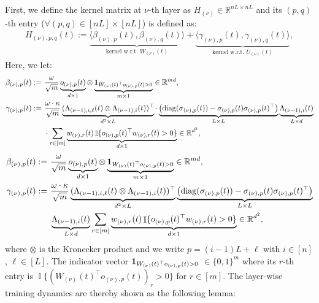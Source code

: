 \documentclass[11pt]{article}
\theoremstyle{plain}
\newcommand{\R}{\mathbb{R}}
\DeclareMathOperator{\I}{\mathbb{I}}
\DeclareMathOperator{\diag}{diag}
\begin{document}
First, we define the kernel matrix at $\nu$-th layer as $H_{(\nu)} \in \R^{nL \times nL}$ and its $(p, q)$-th entry ($\forall (p, q) \in [nL] \times [nL]$) is defined as:
\begin{align*}
    H_{(\nu), p, q}(t) := \underbrace{\langle \beta_{(\nu), p}(t), \beta_{(\nu), q}(t) \rangle}_{\text{kernel w.r.t. $W_{(\nu)}(t)$}} + \underbrace{\langle \gamma_{(\nu), p}(t), \gamma_{(\nu), q}(t) \rangle}_{\text{kernel w.r.t. $U_{(\nu)}(t)$}},
\end{align*}
Here, we let:
\ifdefined\isarxiv
\begin{align*}
    \beta_{(\nu), p}(t) := & ~ \frac{\omega}{\sqrt{m}} \underbrace{o_{(\nu), p}(t)}_{d \times 1} \otimes \underbrace{{\bf 1}_{W_{(\nu)}(t)^\top o_{(\nu), p}(t) > 0}}_{m\times 1} \in \R^{md}, \\
    \gamma_{(\nu), p}(t) := & ~ \frac{\omega \cdot \kappa}{\sqrt{m}} \underbrace{(\Lambda_{(\nu-1), i, \ell}(t) \otimes \Lambda_{(\nu-1), i}(t))^\top}_{d^2 \times L} \cdot\underbrace{\left(\diag(\sigma_{(\nu), p}(t)) - \sigma_{(\nu), p}(t)\sigma_{(\nu), p}(t)^\top\right)}_{L\times L} \underbrace{\Lambda_{(\nu-1), i }(t)}_{L \times d}\\
    & ~ \cdot \sum_{r\in [m]} \underbrace{ w_{(\nu), r}(t) \I\{ o_{(\nu), p}(t)^\top w_{(\nu), r}(t) > 0\}}_{d \times 1} \in \R^{d^2},
\end{align*}
\else
\begin{align*}
    \beta_{(\nu), p}(t) := & ~ \frac{\omega}{\sqrt{m}} \underbrace{o_{(\nu), p}(t)}_{d \times 1} \otimes \underbrace{{\bf 1}_{W_{(\nu)}(t)^\top o_{(\nu), p}(t) > 0}}_{m\times 1} \in \R^{md}, \\
    \gamma_{(\nu), p}(t) := & ~ \frac{\omega \cdot \kappa}{\sqrt{m}} \underbrace{(\Lambda_{(\nu-1), i, \ell}(t) \otimes \Lambda_{(\nu-1), i}(t))^\top}_{d^2 \times L} \underbrace{\left(\diag(\sigma_{(\nu), p}(t)) - \sigma_{(\nu), p}(t)\sigma_{(\nu), p}(t)^\top\right)}_{L\times L} \\
    & ~ \underbrace{\Lambda_{(\nu-1), i }(t)}_{L \times d} \sum_{r\in [m]} \underbrace{ w_{(\nu), r}(t) \I\{ o_{(\nu), p}(t)^\top w_{(\nu), r}(t) > 0\}}_{d \times 1} \in \R^{d^2},
\end{align*}
\fi
where $\otimes $ is the Kronecker product and we write $p = (i-1)L + \ell$ with $i \in [n]$, $\ell \in [L]$. The indicator vector ${\bf 1}_{W_{(\nu)}(t)^\top o_{(\nu), p}(t) > 0} $ $ \in \{0, 1\}^{m}$ where its $r$-th entry is $\I\{ \left(W_{(\nu)}(t)^\top o_{(\nu), p}(t) \right)_r > 0\}$ for $r \in [m]$.
The layer-wise training dynamics are thereby shown as the following lemma:
\end{document}

